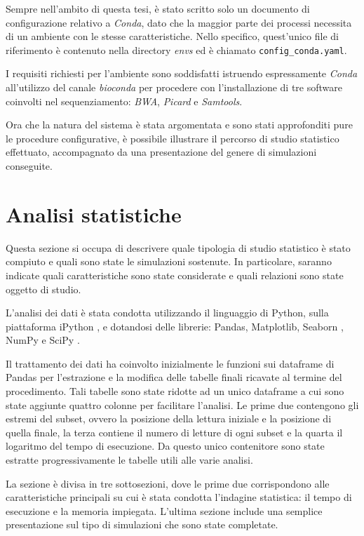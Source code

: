 Sempre nell'ambito di questa tesi, è stato scritto solo un documento di configurazione relativo a \textit{Conda}, dato che la maggior parte dei processi necessita di un ambiente con le stesse caratteristiche.
Nello specifico, quest'unico file di riferimento è contenuto nella directory \textit{envs} ed è chiamato \verb!config_conda.yaml!.

I requisiti richiesti per l'ambiente sono soddisfatti istruendo espressamente \textit{Conda} all'utilizzo del canale \textit{bioconda} per procedere con l'installazione di tre software coinvolti nel sequenziamento: \textit{BWA}, \textit{Picard} e \textit{Samtools}.

Ora che la natura del sistema è stata argomentata e sono stati approfonditi pure le procedure configurative, è possibile illustrare il percorso di studio statistico effettuato, accompagnato da una presentazione del genere di simulazioni conseguite.

\section{Analisi statistiche}
Questa sezione si occupa di descrivere quale tipologia di studio statistico è stato compiuto e quali sono state le simulazioni sostenute. 
In particolare, saranno indicate quali caratteristiche sono state considerate e quali relazioni sono state oggetto di studio.     

L'analisi dei dati è stata condotta utilizzando il linguaggio di Python, sulla piattaforma iPython \cite{IPython}, e dotandosi delle librerie: Pandas, Matplotlib, Seaborn \cite{seaborn}, NumPy \cite{Numpy} e SciPy \cite{Scipy}.

Il trattamento dei dati ha coinvolto inizialmente le funzioni sui dataframe di Pandas per l'estrazione e la modifica delle tabelle finali ricavate al termine del procedimento.
Tali tabelle sono state ridotte ad un unico dataframe a cui sono state aggiunte quattro colonne per facilitare l'analisi. 
Le prime due contengono gli estremi del subset, ovvero la posizione della lettura iniziale e la posizione di quella finale, la terza contiene il numero di letture di ogni subset e la quarta il logaritmo del tempo di esecuzione.
Da questo unico contenitore sono state estratte progressivamente le tabelle utili alle varie analisi.

La sezione è divisa in tre sottosezioni, dove le prime due corrispondono alle caratteristiche principali su cui è stata condotta l'indagine statistica: il tempo di esecuzione e la memoria impiegata. 
L'ultima sezione include una semplice presentazione sul tipo di simulazioni che sono state completate.


